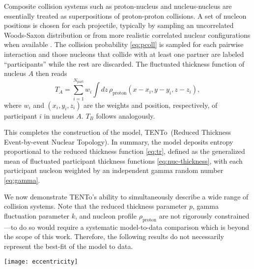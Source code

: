 \documentclass[aps,prc,reprint,amsmath,noeprint]{revtex4-1}
\newcommand{\psec}[1]{\phantomsection\addcontentsline{toc}{section}{#1}}
\newcommand{\trento}{T\raisebox{-.5ex}{R}ENTo}
\newcommand{\eccratio}{\sqrt{\langle \varepsilon_2^2 \rangle}/\sqrt{\langle \varepsilon_3^2 \rangle}^{\,0.6}}
\begin{document}
Composite collision systems such as proton-nucleus and nucleus-nucleus are essentially treated as
superpositions of proton-proton collisions.
A set of nucleon positions is chosen for each projectile, typically by sampling an uncorrelated Woods-Saxon distribution or from more realistic correlated nuclear configurations when available \cite{Alvioli:2009ab}.
The collision probability \eqref{eq:pcoll} is sampled for each pairwise interaction and those nucleons that collide with at least one partner are labeled ``participants'' while the rest are discarded.
The fluctuated thickness function of nucleus $A$ then reads
\begin{equation}
  T_A = \sum_{i=1}^{N_\text{part}} w_i \int dz \, \rho_\text{proton}(x - x_i, y - y_i, z - z_i),
  \label{eq:nuc-thickness}
\end{equation}
where $w_i$ and $(x_i, y_i, z_i)$ are the weights and position, respectively, of participant $i$ in nucleus $A$.
$T_B$ follows analogously.

This completes the construction of the model, \trento\ (Reduced Thickness Event-by-event Nuclear Topology).
In summary, the model deposits entropy proportional to the reduced thickness function \eqref{eq:tr}, defined as the generalized mean of fluctuated participant thickness functions \eqref{eq:nuc-thickness}, with each participant nucleon weighted by an independent gamma random number \eqref{eq:gamma}.

\psec{Applications}

We now demonstrate \trento's ability to simultaneously describe a wide range of collision systems.
Note that the reduced thickness parameter $p$, gamma fluctuation parameter $k$, and nucleon profile $\rho_\text{proton}$ are not rigorously constrained---to do so would require a systematic model-to-data comparison \cite{Bernhard:2015hxa} which is beyond the scope of this work.
Therefore, the following results do not necessarily represent the best-fit of the model to data.

\begin{figure*}[t]
  \texttt{[image: eccentricity]}
  \caption{
    \label{fig:eccen}
    (Color online)
    Left and middle plots:
    Eccentricity harmonics $\varepsilon_2$ and $\varepsilon_3$ as a function of centrality for reduced thickness parameters $p = 1$, 0, $-1$ (green dashed, blue solid, orange dash-dotted).
    The shaded bands show the sensitivity from varying $k$ by $\pm30\%$ from the values in table~\ref{tab:nch}.
    Right plot:
    Ratio of the rms eccentricities $\eccratio$ against the allowed region (grey band) and the ratio computed by IP-Glasma (circles) \cite{Retinskaya:2013gca}.
    Note that the axes have different ranges in the ratio plot.
  }
\end{figure*}
\end{document}
